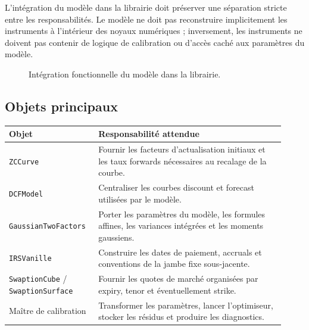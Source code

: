 \documentclass[11pt,a4paper]{article}
\newcommand{\code}[1]{\texttt{#1}}
\begin{document}
L'intégration du modèle dans la librairie doit préserver une séparation stricte entre les responsabilités. Le modèle ne doit pas reconstruire implicitement les instruments à l'intérieur des noyaux numériques ; inversement, les instruments ne doivent pas contenir de logique de calibration ou d'accès caché aux paramètres du modèle.

\begin{figure}[h!]
\centering
{}
\caption{Intégration fonctionnelle du modèle dans la librairie.}
\label{fig:integration-librairie}
\end{figure}

\subsection{Objets principaux}

\begin{longtable}{p{0.28\linewidth}p{0.64\linewidth}}
\toprule
\textbf{Objet} & \textbf{Responsabilité attendue}\\
\midrule
\code{ZCCurve} & Fournir les facteurs d'actualisation initiaux et les taux forwards nécessaires au recalage de la courbe.\\
\code{DCFModel} & Centraliser les courbes discount et forecast utilisées par le modèle.\\
\code{GaussianTwoFactors} & Porter les paramètres du modèle, les formules affines, les variances intégrées et les moments gaussiens.\\
\code{IRSVanille} & Construire les dates de paiement, accruals et conventions de la jambe fixe sous-jacente.\\
\code{SwaptionCube} / \code{SwaptionSurface} & Fournir les quotes de marché organisées par expiry, tenor et éventuellement strike.\\
Maître de calibration & Transformer les paramètres, lancer l'optimiseur, stocker les résidus et produire les diagnostics.\\
\bottomrule
\end{longtable}
\end{document}
